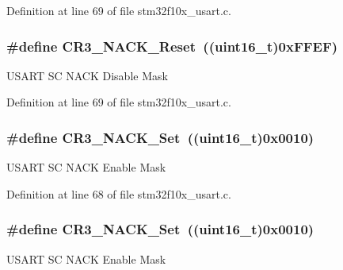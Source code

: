 Definition at line 69 of file stm32f10x\+\_\+usart.\+c.

\subsubsection[{\texorpdfstring{C\+R3\+\_\+\+N\+A\+C\+K\+\_\+\+Reset}{CR3_NACK_Reset}}]{\setlength{\rightskip}{0pt plus 5cm}\#define C\+R3\+\_\+\+N\+A\+C\+K\+\_\+\+Reset~(({\bf uint16\+\_\+t})0x\+F\+F\+E\+F)}\hypertarget{group___u_s_a_r_t___private___defines_gabed0cac273ff4faf009e8c35243c1e10}{}\label{group___u_s_a_r_t___private___defines_gabed0cac273ff4faf009e8c35243c1e10}
U\+S\+A\+RT SC N\+A\+CK Disable Mask 

Definition at line 69 of file stm32f10x\+\_\+usart.\+c.

\subsubsection[{\texorpdfstring{C\+R3\+\_\+\+N\+A\+C\+K\+\_\+\+Set}{CR3_NACK_Set}}]{\setlength{\rightskip}{0pt plus 5cm}\#define C\+R3\+\_\+\+N\+A\+C\+K\+\_\+\+Set~(({\bf uint16\+\_\+t})0x0010)}\hypertarget{group___u_s_a_r_t___private___defines_ga950cc9f7251709854754add7d9aaca60}{}\label{group___u_s_a_r_t___private___defines_ga950cc9f7251709854754add7d9aaca60}
U\+S\+A\+RT SC N\+A\+CK Enable Mask 

Definition at line 68 of file stm32f10x\+\_\+usart.\+c.

\subsubsection[{\texorpdfstring{C\+R3\+\_\+\+N\+A\+C\+K\+\_\+\+Set}{CR3_NACK_Set}}]{\setlength{\rightskip}{0pt plus 5cm}\#define C\+R3\+\_\+\+N\+A\+C\+K\+\_\+\+Set~(({\bf uint16\+\_\+t})0x0010)}\hypertarget{group___u_s_a_r_t___private___defines_ga950cc9f7251709854754add7d9aaca60}{}\label{group___u_s_a_r_t___private___defines_ga950cc9f7251709854754add7d9aaca60}
U\+S\+A\+RT SC N\+A\+CK Enable Mask 

